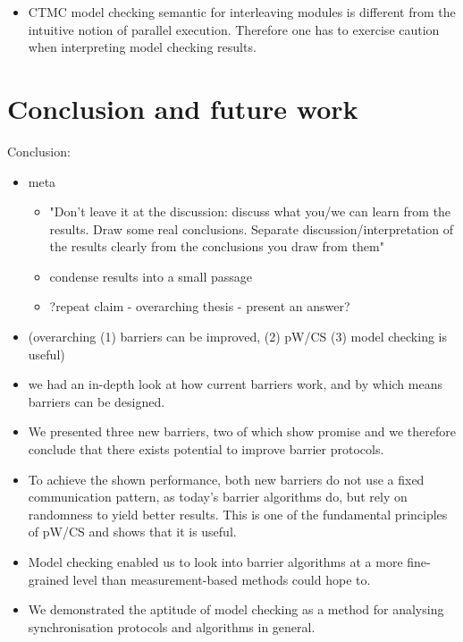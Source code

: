 \documentclass[a4paper, 10pt]{article}
\begin{document}
\begin{itemize}
	\item CTMC model checking semantic for interleaving modules is different from the intuitive notion of parallel execution. Therefore one has to exercise caution when interpreting model checking results.
\end{itemize}

\section{Conclusion and future work}
\label{sec:conclusion}
Conclusion:
\begin{itemize}
	\item meta
		\begin{itemize}
			\item "Don't leave it at the discussion: discuss what you/we can learn from the results. Draw some real conclusions. Separate discussion/interpretation of the results clearly from the conclusions you draw from them"
			\item condense results into a small passage
			\item ?repeat claim - overarching thesis - present an answer?
		\end{itemize}
	\item (overarching (1) barriers can be improved, (2) pW/CS (3) model checking is useful)
	\item we had an in-depth look at how current barriers work, and by which means barriers can be designed.
	\item We presented three new barriers, two of which show promise and we therefore conclude that there exists potential to improve barrier protocols.
	\item To achieve the shown performance, both new barriers do not use a fixed communication pattern, as today's barrier algorithms do, but rely on randomness to yield better results. This is one of the fundamental principles of pW/CS and shows that it is useful.
	\item Model checking enabled us to look into barrier algorithms at a more fine-grained level than measurement-based methods could hope to.
	\item We demonstrated the aptitude of model checking as a method for analysing synchronisation protocols and algorithms in general.
\end{itemize}
\end{document}
